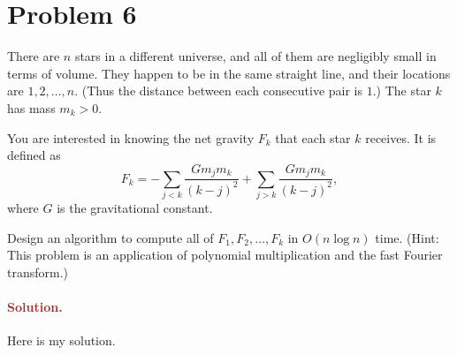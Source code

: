 \section*{Problem 6}
There are $n$ stars in a different universe, and all of them are negligibly small in terms of volume. They happen to be in the same straight line, and their locations are $1, 2, \ldots, n$. (Thus the distance between each consecutive pair is $1$.) The star $k$ has mass $m_k > 0$.

You are interested in knowing the net gravity $F_k$ that each star $k$ receives. It is defined as
\[
F_k = -\sum_{j < k} \frac{G m_j m_k}{(k - j)^2} + \sum_{j > k} \frac{G m_j m_k}{(k - j)^2},
\]
where $G$ is the gravitational constant.

Design an algorithm to compute all of $F_1, F_2, \ldots, F_k$ in $O(n \log n)$ time. (Hint: This problem is an application of polynomial multiplication and the fast Fourier transform.)

\paragraph{\textcolor{brown}{Solution.}}
Here is my solution.
